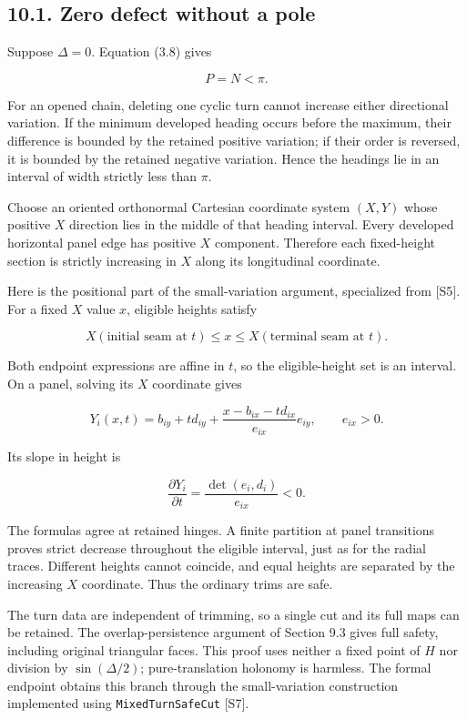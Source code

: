 \documentclass[
  11pt,
  letterpaper,
]{article}
\begin{document}
\subsection{10.1. Zero defect without a
pole}\label{zero-defect-without-a-pole}

Suppose \(\Delta=0\). Equation (3.8) gives

\[
P=N<\pi.
\tag{10.1}
\]

For an opened chain, deleting one cyclic turn cannot increase either
directional variation. If the minimum developed heading occurs before
the maximum, their difference is bounded by the retained positive
variation; if their order is reversed, it is bounded by the retained
negative variation. Hence the headings lie in an interval of width
strictly less than \(\pi\).

Choose an oriented orthonormal Cartesian coordinate system \((X,Y)\)
whose positive \(X\) direction lies in the middle of that heading
interval. Every developed horizontal panel edge has positive \(X\)
component. Therefore each fixed-height section is strictly increasing in
\(X\) along its longitudinal coordinate.

Here is the positional part of the small-variation argument, specialized
from {[}S5{]}. For a fixed \(X\) value \(x\), eligible heights satisfy

\[
X(\text{initial seam at }t)\le x\le X(\text{terminal seam at }t).
\]

Both endpoint expressions are affine in \(t\), so the eligible-height
set is an interval. On a panel, solving its \(X\) coordinate gives

\[
Y_i(x,t)=b_{iy}+t d_{iy}
+\frac{x-b_{ix}-t d_{ix}}{e_{ix}}e_{iy},
\qquad e_{ix}>0.
\]

Its slope in height is

\[
\frac{\partial Y_i}{\partial t}
=\frac{\det(e_i,d_i)}{e_{ix}}<0.
\tag{10.2}
\]

The formulas agree at retained hinges. A finite partition at panel
transitions proves strict decrease throughout the eligible interval,
just as for the radial traces. Different heights cannot coincide, and
equal heights are separated by the increasing \(X\) coordinate. Thus the
ordinary trims are safe.

The turn data are independent of trimming, so a single cut and its full
maps can be retained. The overlap-persistence argument of Section 9.3
gives full safety, including original triangular faces. This proof uses
neither a fixed point of \(H\) nor division by \(\sin(\Delta/2)\);
pure-translation holonomy is harmless. The formal endpoint obtains this
branch through the small-variation construction implemented using
\texttt{MixedTurnSafeCut} {[}S7{]}.
\end{document}
